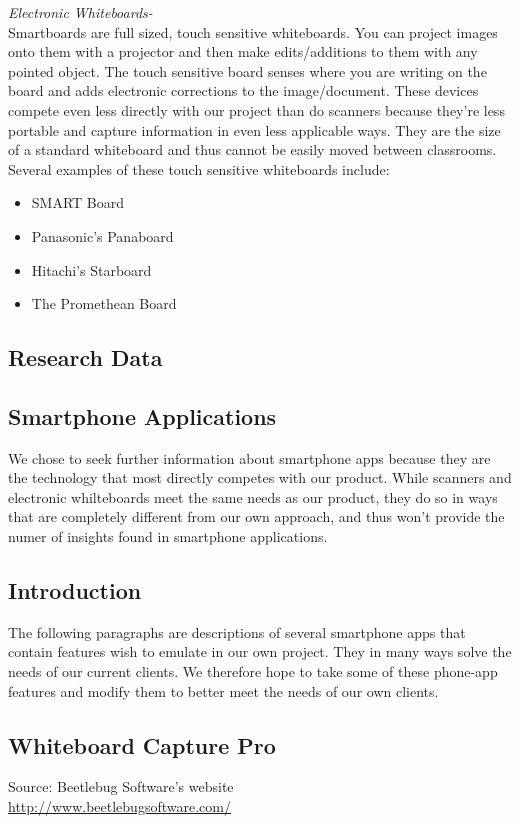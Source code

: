 \documentclass{article}
\begin{document}
		
		\noindent \emph{Electronic Whiteboards-} \\
Smartboards are full sized, touch sensitive whiteboards. You can project images onto them with a projector and then make edits/additions to them with any pointed object. The touch sensitive board senses where you are writing on the board and adds electronic corrections to the image/document. These devices compete even less directly with our project than do scanners because they're less portable and capture information in even less applicable ways. They are the size of a standard whiteboard and thus cannot be easily moved between classrooms. Several examples of these touch sensitive whiteboards include:
            \begin{itemize}
                \item SMART Board
                \item Panasonic's Panaboard
                \item Hitachi's Starboard
                \item The Promethean Board
            \end{itemize}
			
		\subsection*{Research Data}
		
			\subsection*{Smartphone Applications}
We chose to seek further information about smartphone apps because they are the technology that most directly competes with our product. While scanners and electronic whilteboards meet the same needs as our product, they do so in ways that are completely different from our own approach, and thus won't provide the numer of insights found in smartphone applications.

			\subsection*{Introduction}
The following paragraphs are descriptions of several smartphone apps that contain features wish to emulate in our own project. They in many ways solve the needs of our current clients. We therefore hope to take some of these phone-app features and modify them to better meet the needs of our own clients. \\
				\subsection*{Whiteboard Capture Pro}
Source: Beetlebug Software's website\\
{\color{red} \url{http://www.beetlebugsoftware.com/}} \\
					
\end{document}

